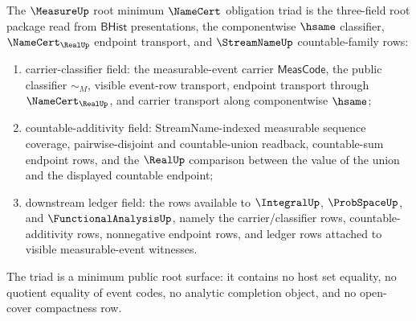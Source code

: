 \begin{definition}
\label{def:measure-root-minimum-namecert-obligation-triad}
The $\MeasureUp$ root minimum $\NameCert$ obligation triad is the
three-field root package read from $\mathsf{BHist}$ presentations, the
componentwise $\hsame$ classifier, $\NameCert_{\RealUp}$ endpoint transport,
and $\StreamNameUp$ countable-family rows:
\begin{enumerate}
  \item carrier-classifier field: the measurable-event carrier
  $\mathsf{MeasCode}$, the public classifier $\sim_M$, visible event-row
  transport, endpoint transport through $\NameCert_{\RealUp}$, and carrier
  transport along componentwise $\hsame$;
  \item countable-additivity field: StreamName-indexed measurable sequence
  coverage, pairwise-disjoint and countable-union readback, countable-sum
  endpoint rows, and the $\RealUp$ comparison between the value of the union
  and the displayed countable endpoint;
  \item downstream ledger field: the rows available to $\IntegralUp$,
  $\ProbSpaceUp$, and $\FunctionalAnalysisUp$, namely the
  carrier/classifier rows, countable-additivity rows, nonnegative endpoint
  rows, and ledger rows attached to visible measurable-event witnesses.
\end{enumerate}
The triad is a minimum public root surface: it contains no host set equality,
no quotient equality of event codes, no analytic completion object, and no
open-cover compactness row.
\end{definition}

